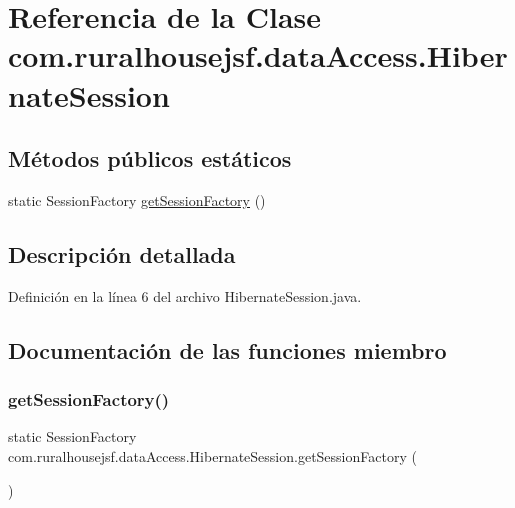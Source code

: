 \hypertarget{classcom_1_1ruralhousejsf_1_1data_access_1_1_hibernate_session}{}\section{Referencia de la Clase com.\+ruralhousejsf.\+data\+Access.\+Hibernate\+Session}
\label{classcom_1_1ruralhousejsf_1_1data_access_1_1_hibernate_session}
\subsection*{Métodos públicos estáticos}
\begin{DoxyCompactItemize}
\item 
static Session\+Factory \mbox{\hyperlink{classcom_1_1ruralhousejsf_1_1data_access_1_1_hibernate_session_ac3420369289a3eb4051f880815d4b5c1}{get\+Session\+Factory}} ()
\end{DoxyCompactItemize}


\subsection{Descripción detallada}


Definición en la línea 6 del archivo Hibernate\+Session.\+java.



\subsection{Documentación de las funciones miembro}
\mbox{\label{classcom_1_1ruralhousejsf_1_1data_access_1_1_hibernate_session_ac3420369289a3eb4051f880815d4b5c1}} 
\subsubsection{\texorpdfstring{getSessionFactory()}{getSessionFactory()}}
{\footnotesize\ttfamily static Session\+Factory com.\+ruralhousejsf.\+data\+Access.\+Hibernate\+Session.\+get\+Session\+Factory (\begin{DoxyParamCaption}{ }\end{DoxyParamCaption})\hspace{0.3cm}{\ttfamily [static]}}



